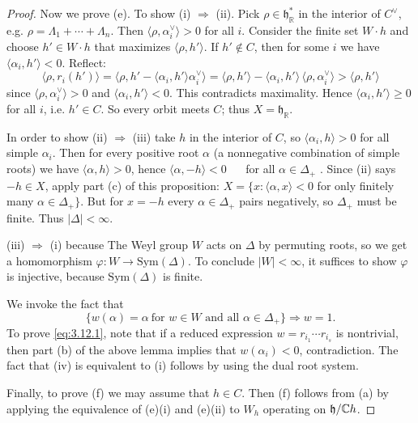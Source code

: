 \documentclass[12pt]{article}
\begin{document}
\begin{proof}
Now we prove (e). To show (i) $\Rightarrow$ (ii). Pick $\rho\in \mathfrak{h}_{\mathbb{R}}^*$ in the interior of $C^\vee$, e.g. $\rho=\Lambda_1+\cdots+\Lambda_n$. Then
$\langle \rho,\alpha_i^\vee\rangle>0$ for all $i$.
Consider the finite set $W\cdot h$ and choose $h'\in W\cdot h$ that maximizes $\langle \rho, h' \rangle$.
If $h'\notin C$, then for some $i$ we have $\langle \alpha_i,h'\rangle<0$. Reflect:
\[
\langle \rho, r_i(h')\rangle
= \langle \rho, h' - \langle \alpha_i,h'\rangle \alpha_i^\vee\rangle
= \langle \rho, h'\rangle - \langle \alpha_i,h'\rangle\,\langle \rho,\alpha_i^\vee\rangle
> \langle \rho,h'\rangle
\]
since $\langle \rho,\alpha_i^\vee\rangle>0$ and $\langle \alpha_i,h'\rangle<0$. This contradicts maximality. Hence $\langle \alpha_i,h'\rangle\ge 0$ for all $i$, i.e. $h'\in C$. So every orbit meets $C$; thus $X=\mathfrak{h}_{\mathbb{R}}$.

In order to show (ii) $\Rightarrow$ (iii) take $h$ in the interior of $C$, so $\langle \alpha_i,h\rangle>0$ for all simple $\alpha_i$. Then for every positive root $\alpha$ (a nonnegative combination of simple roots) we have $\langle \alpha, h\rangle>0$, hence
$\langle \alpha,-h\rangle<0$ $\quad$ for all $\alpha\in\Delta_+$ .
Since (ii) says $-h\in X$, apply part (c) of this proposition: $X=\{x : \langle \alpha,x\rangle<0$ for only finitely many $\alpha\in\Delta_+\}$. But for $x=-h$ every $\alpha\in\Delta_+$ pairs negatively, so $\Delta_+$ must be finite. Thus $|\Delta|<\infty$.

(iii) $\Rightarrow$ (i) because The Weyl group $W$ acts on $\Delta$ by permuting roots, so we get a homomorphism $\varphi: W \longrightarrow \mathrm{Sym}(\Delta)$. To conclude $|W|<\infty$, it suffices to show $\varphi$ is injective, because $\mathrm{Sym}(\Delta)$ is finite.

We invoke the fact that
\begin{equation}\label{eq:3.12.1}
   \{ w(\alpha) = \alpha \ \text{for } w\in W \text{ and all } \alpha \in \Delta_+ \}
   \Rightarrow w=1.
\end{equation}
To prove \eqref{eq:3.12.1}, note that if a reduced expression $w=r_{i_1}\cdots r_{i_s}$ 
is nontrivial, then part (b) of the above lemma implies that $w(\alpha_i)<0$, contradiction. 
The fact that (iv) is equivalent to (i) follows by using the dual root system.

Finally, to prove (f) we may assume that $h \in C$. Then (f) follows from (a) 
by applying the equivalence of (e)(i) and (e)(ii) to $W_h$ operating on $\mathfrak{h}/\mathbb{C} h$.
\end{proof}
\end{document}

